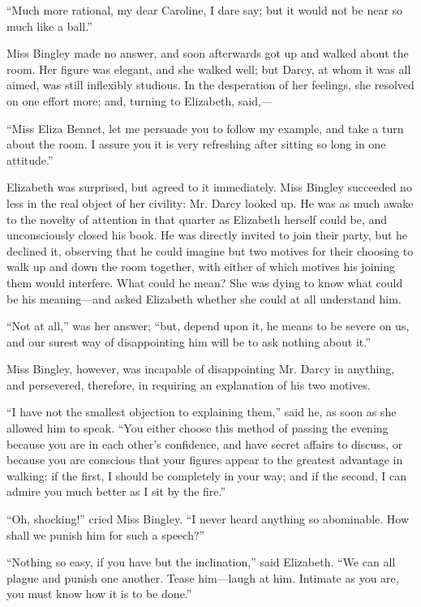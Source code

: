 \documentclass[12pt,openright]{book}
\begin{document}
“Much more rational, my dear Caroline, I dare say; but it would not be near so much like a ball.”

Miss Bingley made no answer, and soon afterwards got up and walked about the room. Her figure was elegant, and she walked well; but Darcy, at whom it was all aimed, was still inflexibly studious. In the desperation of her feelings, she resolved on one effort more; and, turning to Elizabeth, said,—

“Miss Eliza Bennet, let me persuade you to follow my example, and take a turn about the room. I assure you it is very refreshing after sitting so long in one attitude.”

Elizabeth was surprised, but agreed to it immediately. Miss Bingley succeeded no less in the real object of her civility: Mr. Darcy looked up. He was as much awake to the novelty of attention in that quarter as Elizabeth herself could be, and unconsciously closed his book. He was directly invited to join their party, but he declined it, observing that he could imagine but two motives for their choosing to walk up and down the room together, with either of which motives his joining them would interfere. What could he mean? She was dying to know what could be his meaning—and asked Elizabeth whether she could at all understand him.

“Not at all,” was her answer; “but, depend upon it, he means to be severe on us, and our surest way of disappointing him will be to ask nothing about it.”

Miss Bingley, however, was incapable of disappointing Mr. Darcy in anything, and persevered, therefore, in requiring an explanation of his two motives.

“I have not the smallest objection to explaining them,” said he, as soon as she allowed him to speak. “You either choose this method of passing the evening because you are in each other’s confidence, and have secret affairs to discuss, or because you are conscious that your figures appear to the greatest advantage in walking: if the first, I should be completely in your way; and if the second, I can admire you much better as I sit by the fire.”

“Oh, shocking!” cried Miss Bingley. “I never heard anything so abominable. How shall we punish him for such a speech?”

“Nothing so easy, if you have but the inclination,” said Elizabeth. “We can all plague and punish one another. Tease him—laugh at him. Intimate as you are, you must know how it is to be done.”
\end{document}
